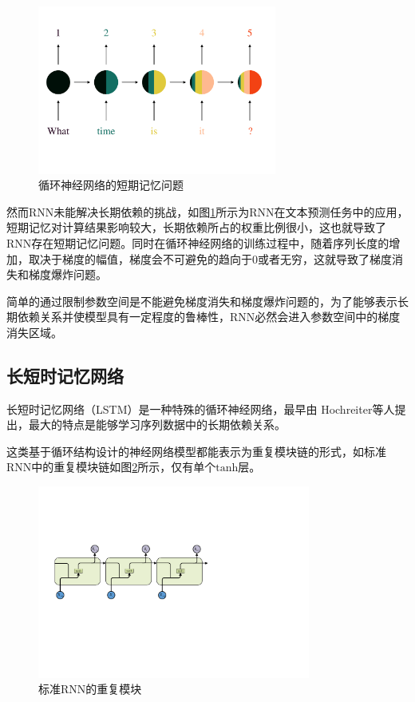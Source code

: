 \documentclass[master]{thesis-uestc}
\begin{document}
\begin{figure}[!ht]
\centering 
\includegraphics[width=0.7\textwidth]{./pic/rnn4.pdf}
\caption{循环神经网络的短期记忆问题}
\label{Figure.2.2}
\end{figure}
然而RNN未能解决长期依赖的挑战，如图\ref{Figure.2.2}所示为RNN在文本预测任务中的应用，短期记忆对计算结果影响较大，长期依赖所占的权重比例很小，这也就导致了RNN存在短期记忆问题。同时在循环神经网络的训练过程中，随着序列长度的增加，取决于梯度的幅值，梯度会不可避免的趋向于0或者无穷，这就导致了梯度消失和梯度爆炸问题。

简单的通过限制参数空间是不能避免梯度消失和梯度爆炸问题的，为了能够表示长期依赖关系并使模型具有一定程度的鲁棒性，RNN必然会进入参数空间中的梯度消失区域。

\subsection{长短时记忆网络}
长短时记忆网络（LSTM）是一种特殊的循环神经网络，最早由
Hochreiter等人提出，最大的特点是能够学习序列数据中的长期依赖关系。

这类基于循环结构设计的神经网络模型都能表示为重复模块链的形式，如标准RNN中的重复模块链如图\ref{Figure.2.3}所示，仅有单个$\mathrm{tanh}$层。
\begin{figure}[!ht]
\centering 
\includegraphics[width=0.8\textwidth]{./pic/SimpleRNN.pdf}
\caption{标准RNN的重复模块}
\label{Figure.2.3}
\end{figure}
\end{document}
